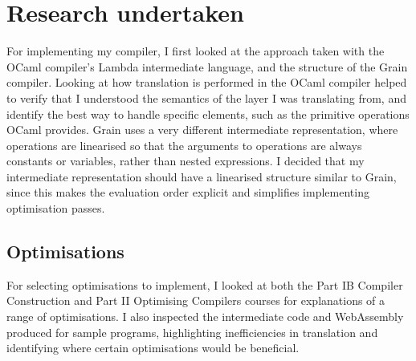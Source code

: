 

\section{Research undertaken}
For implementing my compiler, I first looked at the approach taken with the OCaml compiler's Lambda intermediate language, and the structure of the Grain compiler. Looking at how translation is performed in the OCaml compiler helped to verify that I understood the semantics of the layer I was translating from, and identify the best way to handle specific elements, such as the primitive operations OCaml provides. Grain uses a very different intermediate representation, where operations are linearised so that the arguments to operations are always constants or variables, rather than nested expressions. 
I decided that my intermediate representation should have a linearised structure similar to Grain, since this makes the evaluation order explicit and simplifies implementing optimisation passes. %



\subsection{Optimisations}
For selecting optimisations to implement, I looked at both the Part IB Compiler Construction \cite{IB-compilers} and Part II Optimising Compilers \cite{optimising-compilers} courses for explanations of a range of optimisations. %
I also inspected the intermediate code and WebAssembly produced for sample programs, highlighting inefficiencies in translation and identifying where certain optimisations would be beneficial.

